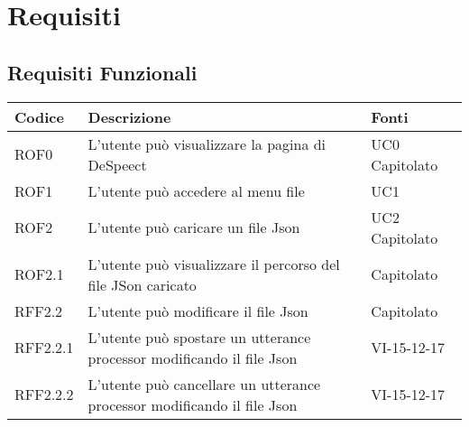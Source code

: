 \documentclass[../AnalisideiRequisiti.tex]{subfiles}
\begin{document}
	\chapter{Requisiti}
	\section{Requisiti Funzionali}
	\begin{longtable}{| p{3cm} | p{6cm} | p{3cm} |}
		\hline
		\textbf{Codice} & \textbf{Descrizione} & \textbf{Fonti}\\
		\hline
		\endhead
		\newline ROF0&
		\newline L'utente può visualizzare la pagina di DeSpeect&
		\newline UC0 \newline Capitolato
		\\[1em]
		\hline
		\newline ROF1&
		\newline L'utente può accedere al menu file&
		\newline UC1
		\\[1em]	
		
		\hline
			
		
		\newline ROF2&
		\newline L'utente può caricare un file Json&
		\newline UC2 \newline Capitolato
		\\[1em]	
			\hline	
			
		\newline ROF2.1&
		\newline L'utente può visualizzare il percorso del file JSon caricato&
		\newline Capitolato
		\\[1em]	
		\hline	
		
		\newline RFF2.2&
		\newline L'utente può modificare il file Json&
		\newline Capitolato
		\\[1em]	
		\hline
				
		\newline RFF2.2.1&
		\newline L'utente può spostare un utterance processor modificando il file Json&
		\newline VI-15-12-17
		\\[1em]	
		\hline
		\newline RFF2.2.2&
		\newline L'utente può cancellare un utterance processor modificando il file Json&
		\newline VI-15-12-17
		\\[1em]	
		\hline
		

\end{longtable}
\end{document}
